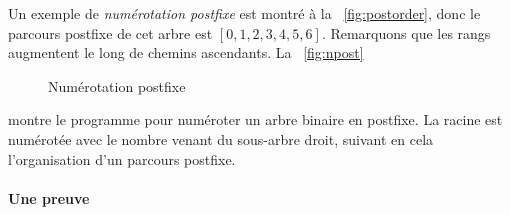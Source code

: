 Un exemple de \emph{numérotation postfixe} est montré à la
\fig~\vref{fig:postorder}, donc le parcours postfixe de cet arbre est
\([0,1,2,3,4,5,6]\). Remarquons que les rangs augmentent le long de
chemins ascendants. La
\fig~\vref{fig:npost}
\begin{figure}
\centering
{}
\caption{Numérotation postfixe}
\label{fig:npost}
\end{figure}
montre le programme pour numéroter un arbre binaire en postfixe. La
racine est numérotée avec le nombre venant du sous-arbre droit, suivant
en cela l'organisation d'un parcours postfixe.

\paragraph{Une preuve}\label{proof_PreMir}

